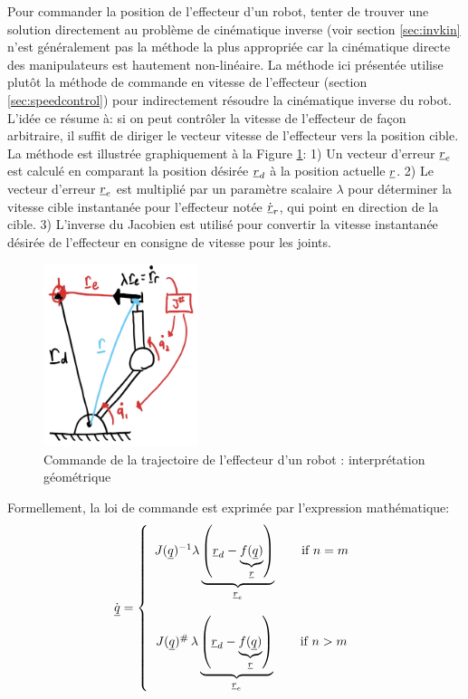 Pour commander la position de l'effecteur d'un robot, tenter de trouver une solution directement au problème de cinématique inverse (voir section \ref{sec:invkin} n'est généralement pas la méthode la plus appropriée car la cinématique directe des manipulateurs est hautement non-linéaire. La méthode ici présentée utilise plutôt la méthode de commande en vitesse de l'effecteur (section \ref{sec:speedcontrol}) pour indirectement résoudre la cinématique inverse du robot. L'idée ce résume à: si on peut contrôler la vitesse de l'effecteur de façon arbitraire, il suffit de diriger le vecteur vitesse de l'effecteur vers la position cible. La méthode est illustrée graphiquement à la Figure \ref{fig:robotspeedcontrolgeo}: 1) Un vecteur d'erreur $\underline{r}_e$ est calculé en comparant la position désirée $\underline{r}_d$ à la position actuelle $\underline{r}$. 2) Le vecteur d'erreur $\underline{r}_e$ est multiplié par un paramètre scalaire $\lambda$ pour déterminer la vitesse cible instantanée pour l'effecteur notée $\dot{\underline{r}}_r$, qui point en direction de la cible. 3) L'inverse du Jacobien est utilisé pour convertir la vitesse instantanée désirée de l'effecteur en consigne de vitesse pour les joints. 
\begin{figure}[H]
	\centering
		\includegraphics[width=0.4\textwidth]{fig/robotspeedcontrolgeo.jpg}
	\caption{Commande de la trajectoire de l'effecteur d'un robot : interprétation géométrique}
	\label{fig:robotspeedcontrolgeo}
\end{figure}
Formellement, la loi de commande est exprimée par l'expression mathématique:
\begin{align}
\dot{\underline{q}} = \left\{ \begin{array}{c}
 J(\underline{q})^{-1} \lambda 
 \underbrace{ \left( \underline{r}_d  - \underbrace{f(\underline{q})}_{\underline{r}}  \right) }_{\underline{r}_e} 
 \quad\quad \text{if $n=m$}
 \\ \\
 J(\underline{q})^{\#} \, \lambda  \underbrace{ \left( \underline{r}_d  - \underbrace{f(\underline{q})}_{\underline{r}}  \right) }_{\underline{r}_e}    \quad\quad \text{if $n>m$}
\end{array}
\right.
\end{align}
